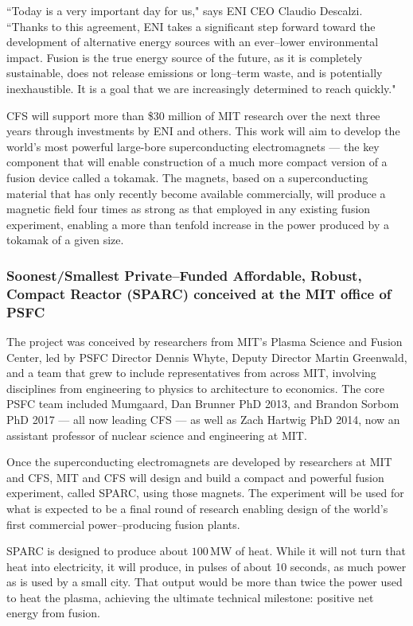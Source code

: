 \documentclass[a4paper,openany,12pt]{report}
\begin{document}
``Today is a very important day for us," says ENI CEO Claudio Descalzi. ``Thanks to this agreement, ENI takes a significant step forward toward the development of alternative energy sources with an ever--lower environmental impact. Fusion is the true energy source of the future, as it is completely sustainable, does not release emissions or long--term waste, and is potentially inexhaustible. It is a goal that we are increasingly determined to reach quickly."

CFS will support more than \$30 million of MIT research over the next three years through investments by ENI and others. This work will aim to develop the world's most powerful large-bore superconducting electromagnets --- the key component that will enable construction of a much more compact version of a fusion device called a tokamak. The magnets, based on a superconducting material that has only recently become available commercially, will produce a magnetic field four times as strong as that employed in any existing fusion experiment, enabling a more than tenfold increase in the power produced by a tokamak of a given size.

\subsubsection{Soonest/Smallest Private--Funded Affordable, Robust, Compact Reactor (SPARC) conceived at the MIT office of PSFC}

The project was conceived by researchers from MIT's Plasma Science and Fusion Center, led by PSFC Director Dennis Whyte, Deputy Director Martin Greenwald, and a team that grew to include representatives from across MIT, involving disciplines from engineering to physics to architecture to economics. The core PSFC team included Mumgaard, Dan Brunner PhD 2013, and Brandon Sorbom PhD 2017 --- all now leading CFS --- as well as Zach Hartwig PhD 2014, now an assistant professor of nuclear science and engineering at MIT.

Once the superconducting electromagnets are developed by researchers at MIT and CFS, MIT and CFS will design and build a compact and powerful fusion experiment, called SPARC, using those magnets. The experiment will be used for what is expected to be a final round of research enabling design of the world's first commercial power--producing fusion plants.

SPARC is designed to produce about $100\,$MW of heat. While it will not turn that heat into electricity, it will produce, in pulses of about 10 seconds, as much power as is used by a small city. That output would be more than twice the power used to heat the plasma, achieving the ultimate technical milestone: positive net energy from fusion.
\end{document}
